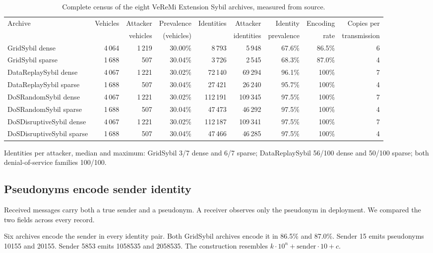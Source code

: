 \documentclass[journal,twoside]{IEEEtran}
\begin{document}
\begin{table}[t]
\caption{Complete census of the eight VeReMi Extension Sybil archives, measured from source.}
\label{tab:census}
\centering
\footnotesize
\begin{tabular}{lrrrrrrrr}
\toprule
Archive & Vehicles & Attacker & Prevalence & Identities & Attacker & Identity & Encoding & Copies per \\
        &          & vehicles & (vehicles) &            & identities & prevalence & rate & transmission \\
\midrule
GridSybil dense            & 4\,064 & 1\,219 & 30.00\% & 8\,793   & 5\,948   & 67.6\% & 86.5\% & 6 \\
GridSybil sparse           & 1\,688 & 507    & 30.04\% & 3\,726   & 2\,545   & 68.3\% & 87.0\% & 4 \\
DataReplaySybil dense      & 4\,067 & 1\,221 & 30.02\% & 72\,140  & 69\,294  & 96.1\% & 100\%  & 7 \\
DataReplaySybil sparse     & 1\,688 & 507    & 30.04\% & 27\,421  & 26\,240  & 95.7\% & 100\%  & 4 \\
DoSRandomSybil dense       & 4\,067 & 1\,221 & 30.02\% & 112\,191 & 109\,345 & 97.5\% & 100\%  & 7 \\
DoSRandomSybil sparse      & 1\,688 & 507    & 30.04\% & 47\,473  & 46\,292  & 97.5\% & 100\%  & 4 \\
DoSDisruptiveSybil dense   & 4\,067 & 1\,221 & 30.02\% & 112\,187 & 109\,341 & 97.5\% & 100\%  & 7 \\
DoSDisruptiveSybil sparse  & 1\,688 & 507    & 30.04\% & 47\,466  & 46\,285  & 97.5\% & 100\%  & 4 \\
\bottomrule
\end{tabular}

\vspace{2pt}
\footnotesize Identities per attacker, median and maximum: GridSybil 3/7 dense and 6/7 sparse;
DataReplaySybil 56/100 dense and 50/100 sparse; both denial-of-service families 100/100.
\end{table}

\subsection{Pseudonyms encode sender identity}

Received messages carry both a true sender and a pseudonym.
A receiver observes only the pseudonym in deployment.
We compared the two fields across every record.

Six archives encode the sender in every identity pair.
Both GridSybil archives encode it in 86.5\% and 87.0\%.
Sender 15 emits pseudonyms 10155 and 20155.
Sender 5853 emits 1058535 and 2058535.
The construction resembles $k\cdot10^{n}+\text{sender}\cdot10+c$.
\end{document}
